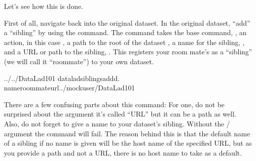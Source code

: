 \sphinxAtStartPar
Let’s see how this is done.

\ignorespaces 
\sphinxAtStartPar
First of all, navigate back into the original dataset.
In the original dataset, “add” a “sibling” by using
the  command.
The command takes the base command,
, an action, in this case , a path to the
root of the dataset , a name for the sibling, ,
and a URL or path to the sibling, .
This registers your room mate’s  as a “sibling” (we will call it
“roommate”) to your own  dataset.

\begin{sphinxVerbatim}[commandchars=\\\{\}]
../../DataLad\PYGZhy{}101
dataladsiblingsadd\PYGZhy{}d.
\PYGZhy{}\PYGZhy{}nameroommate\PYGZhy{}\PYGZhy{}url../mock\PYGZus{}user/DataLad\PYGZhy{}101
\end{sphinxVerbatim}

\sphinxAtStartPar
There are a few confusing parts about this command: For one, do not be surprised
about the  argument \textendash{} it’s called “URL” but it can be a path as well.
Also, do not forget to give a name to your dataset’s sibling. Without the /
 argument the command will fail. The reason behind this is that the default
name of a sibling if no name is given will be the host name of the specified URL,
but as you provide a path and not a URL, there is no host name to take as a default.

